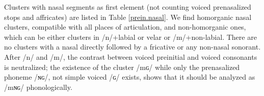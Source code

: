 \documentclass[oneside,a4paper,11pt]{article}
\newcommand{\ipa}[1]{\mbox{\phon/#1/}}
\newcommand{\resetcounters}[2]{
\newcounter{#1}
\newcounter{#2}
 \setcounter{#1}{\value{2clusters}}
  \setcounter{#2}{\value{3clusters}}
 \setcounter{2clusters}{0}
  \setcounter{3clusters}{0}
}
\begin{document}
\begin{landscape}
\begin{table}
{\begin{tabular}{l|lll|lll|lll|l}
\bottomrule
\end{tabular}}
\end{table}
\end{landscape}
 \resetcounters{2xgC}{3xgC} %
Clusters with nasal segments as first element (not counting voiced prenasalized stops and affricates) are listed in Table \ref{prein.nasal}. We find homorganic nasal clusters, compatible with all places of articulation, and non-homorganic ones, which can be either clusters in \ipa{n}+labial or velar or \ipa{m}+non-labial. There are no clusters with a nasal directly followed by a fricative or any non-nasal sonorant. After \ipa{n} and \ipa{m}, the contrast between voiced preinitial and voiced consonants is neutralized; the existence of the cluster \ipa{mɢ} while only the prenasalized phoneme \ipa{ɴɢ}, not simple voiced \ipa{ɢ} exists, shows that it should be analyzed as \ipa{mɴɢ} phonologically.
\end{document}
